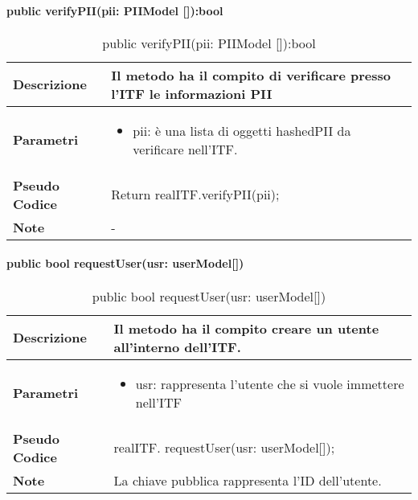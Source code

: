 \paragraph{public verifyPII(pii: PIIModel []):bool}
\begin{center}
    \begin{longtable}{|p{3cm}|p{9cm}|}%
    \caption{public verifyPII(pii: PIIModel []):bool}
    \endfirsthead
    \endhead
    \hline
    \textbf{Descrizione} & Il metodo ha il compito di verificare presso l’ITF le informazioni PII\\
    \hline
    \textbf{Parametri} &      
    \begin{itemize}
        \item pii: è una lista di oggetti hashedPII da verificare nell’ITF.
    \end{itemize}
    \\
    \hline
    \textbf{Pseudo Codice} & 
    Return realITF.verifyPII(pii);
    \\
    \hline
    \textbf{Note} & 
    -
    \\
    \hline
    \end{longtable}
    \end{center}



\paragraph{public bool requestUser(usr: userModel[])}
\begin{center}
    \begin{longtable}{|p{3cm}|p{9cm}|}%
    \caption{public bool requestUser(usr: userModel[])}
    \endfirsthead
    \endhead
    \hline
    \textbf{Descrizione} & Il metodo ha il compito creare un utente all’interno dell’ITF.\\
    \hline
    \textbf{Parametri} &      
    \begin{itemize}
        \item usr: rappresenta l’utente che si vuole immettere nell’ITF
    \end{itemize}
    \\
    \hline
    \textbf{Pseudo Codice} & 
    realITF. requestUser(usr: userModel[]);
    \\
    \hline
    \textbf{Note} & 
    La chiave pubblica rappresenta l’ID dell’utente.
    \\
    \hline
    \end{longtable}
    \end{center}

